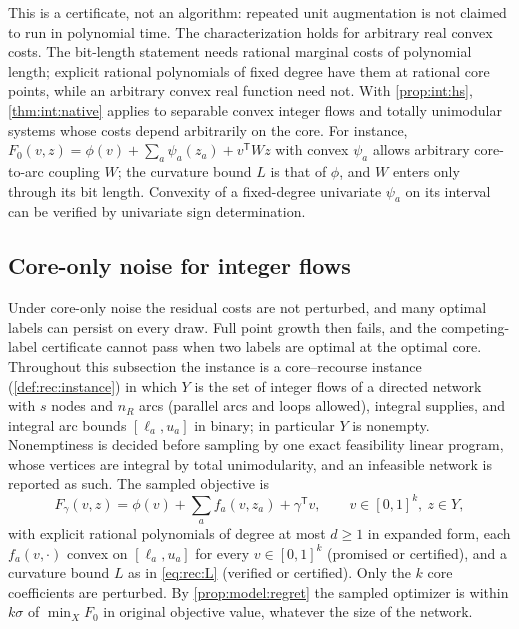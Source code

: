 This is a certificate, not an algorithm: repeated unit augmentation is not
claimed to run in polynomial time. The characterization holds for arbitrary
real convex costs. The bit-length statement needs rational marginal costs
of polynomial length; explicit rational polynomials of fixed degree have
them at rational core points, while an arbitrary convex real function need
not. With \cref{prop:int:hs}, \cref{thm:int:native} applies to separable
convex integer flows and totally unimodular systems whose costs depend
arbitrarily on the core. For instance,
$F_0(v,z)=\phi(v)+\sum_a\psi_a(z_a)+v^{\mathsf T}Wz$ with convex $\psi_a$ allows
arbitrary core-to-arc coupling $W$; the curvature bound $L$ is that of $\phi$,
and $W$ enters only through its bit length. Convexity of a fixed-degree
univariate $\psi_a$ on its interval can be verified by univariate sign
determination.

\subsection{Core-only noise for integer flows}\label{sec:int:flows}

Under core-only noise the residual costs are not perturbed, and many optimal
labels can persist on every draw. Full point growth then fails, and the
competing-label certificate cannot pass when two labels are optimal at the
optimal core. Throughout this subsection the instance is a core--recourse
instance (\cref{def:rec:instance}) in which $Y$ is the set of integer flows
of a directed network with $s$ nodes and $n_R$ arcs (parallel arcs and loops
allowed), integral supplies, and integral arc bounds $[\ell_a,u_a]$ in
binary; in particular $Y$ is nonempty. Nonemptiness is decided before
sampling by one exact feasibility linear program, whose vertices are integral
by total unimodularity, and an infeasible network is reported as such. The
sampled objective is
\begin{equation}\label{eq:int:flow-model}
 F_\gamma(v,z)=\phi(v)+\sum_af_a(v,z_a)+\gamma^{\mathsf T}v,
 \qquad v\in[0,1]^k,\ z\in Y,
\end{equation}
with explicit rational polynomials of degree at most $d\ge1$ in expanded
form, each $f_a(v,\cdot)$ convex on $[\ell_a,u_a]$ for every $v\in[0,1]^k$
(promised or certified), and a curvature bound $L$ as in \eqref{eq:rec:L}
(verified or certified). Only the $k$ core coefficients are perturbed. By
\cref{prop:model:regret} the sampled optimizer is within $k\sigma$ of
$\min_XF_0$ in original objective value, whatever the size of the network.

